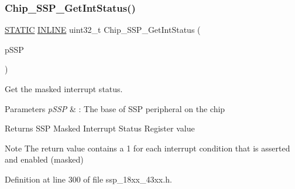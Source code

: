 \subsubsection{\texorpdfstring{Chip\+\_\+\+S\+S\+P\+\_\+\+Get\+Int\+Status()}{Chip\_SSP\_GetIntStatus()}}
{\footnotesize\ttfamily \hyperlink{group___l_p_c___types___public___macros_ga10b2d890d871e1489bb02b7e70d9bdfb}{S\+T\+A\+T\+IC} \hyperlink{spifi__18xx__43xx_8h_a2eb6f9e0395b47b8d5e3eeae4fe0c116}{I\+N\+L\+I\+NE} uint32\+\_\+t Chip\+\_\+\+S\+S\+P\+\_\+\+Get\+Int\+Status (\begin{DoxyParamCaption}\item[{\hyperlink{struct_l_p_c___s_s_p___t}{L\+P\+C\+\_\+\+S\+S\+P\+\_\+T} $\ast$}]{p\+S\+SP }\end{DoxyParamCaption})}



Get the masked interrupt status. 


\begin{DoxyParams}{Parameters}
{\em p\+S\+SP} & \+: The base of S\+SP peripheral on the chip \\
\hline
\end{DoxyParams}
\begin{DoxyReturn}{Returns}
S\+SP Masked Interrupt Status Register value 
\end{DoxyReturn}
\begin{DoxyNote}{Note}
The return value contains a 1 for each interrupt condition that is asserted and enabled (masked) 
\end{DoxyNote}


Definition at line 300 of file ssp\+\_\+18xx\+\_\+43xx.\+h.

\mbox{\label{group___s_s_p__18_x_x__43_x_x_ga0cc48f6c5bea491f2965b5b6fd0dcf69}} 
